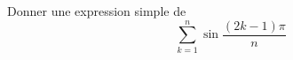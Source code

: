 Donner une expression simple de
\begin{displaymath}
\sum_{k=1}^n \sin \frac{(2k-1)\pi}{n}
\end{displaymath}
\bigskip